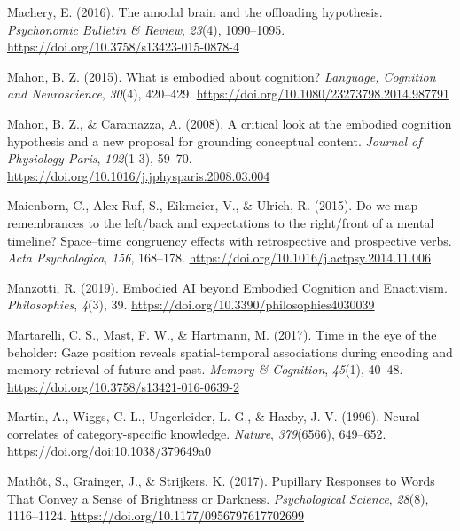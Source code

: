 \documentclass[
  a4paper,12pt,twoside,onecolumn,openright,final,oldfontcommands]{memoir}
\newlength{\cslhangindent}
\newlength{\cslentryspacingunit} %
\newenvironment{CSLReferences}[2] %
 {%
  \setlength{\parindent}{0pt}
  \ifodd #1
  \let\oldpar\par
  \def\par{\hangindent=\cslhangindent\oldpar}
  \fi
  \setlength{\parskip}{#2\cslentryspacingunit}
 }%
 {}
\begin{document}
\begin{CSLReferences}{1}{0}
\leavevmode{}%
Machery, E. (2016). The amodal brain and the offloading hypothesis. \emph{Psychonomic Bulletin \& Review}, \emph{23}(4), 1090--1095. \url{https://doi.org/10.3758/s13423-015-0878-4}

\leavevmode{}%
Mahon, B. Z. (2015). What is embodied about cognition? \emph{Language, Cognition and Neuroscience}, \emph{30}(4), 420--429. \url{https://doi.org/10.1080/23273798.2014.987791}

\leavevmode{}%
Mahon, B. Z., \& Caramazza, A. (2008). A critical look at the embodied cognition hypothesis and a new proposal for grounding conceptual content. \emph{Journal of Physiology-Paris}, \emph{102}(1-3), 59--70. \url{https://doi.org/10.1016/j.jphysparis.2008.03.004}

\leavevmode{}%
Maienborn, C., Alex-Ruf, S., Eikmeier, V., \& Ulrich, R. (2015). Do we map remembrances to the left/back and expectations to the right/front of a mental timeline? {Space}--time congruency effects with retrospective and prospective verbs. \emph{Acta Psychologica}, \emph{156}, 168--178. \url{https://doi.org/10.1016/j.actpsy.2014.11.006}

\leavevmode{}%
Manzotti, R. (2019). Embodied {AI} beyond {Embodied} {Cognition} and {Enactivism}. \emph{Philosophies}, \emph{4}(3), 39. \url{https://doi.org/10.3390/philosophies4030039}

\leavevmode{}%
Martarelli, C. S., Mast, F. W., \& Hartmann, M. (2017). Time in the eye of the beholder: {Gaze} position reveals spatial-temporal associations during encoding and memory retrieval of future and past. \emph{Memory \& Cognition}, \emph{45}(1), 40--48. \url{https://doi.org/10.3758/s13421-016-0639-2}

\leavevmode{}%
Martin, A., Wiggs, C. L., Ungerleider, L. G., \& Haxby, J. V. (1996). Neural correlates of category-specific knowledge. \emph{Nature}, \emph{379}(6566), 649--652. \url{https://doi.org/doi:10.1038/379649a0}

\leavevmode{}%
Mathôt, S., Grainger, J., \& Strijkers, K. (2017). Pupillary {Responses} to {Words} {That} {Convey} a {Sense} of {Brightness} or {Darkness}. \emph{Psychological Science}, \emph{28}(8), 1116--1124. \url{https://doi.org/10.1177/0956797617702699}


\end{CSLReferences}
\end{document}
